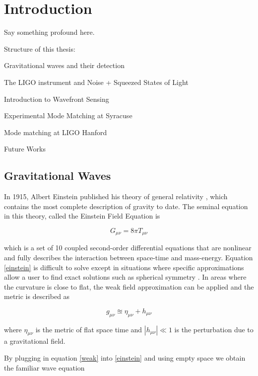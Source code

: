 \chapter{Introduction}\label{intro}

	Say something profound here.
	
	Structure of this thesis:
	
		Gravitational waves and their detection
	
		The LIGO instrument and Noise + Squeezed States of Light
	
		Introduction to Wavefront Sensing
	
		Experimental Mode Matching at Syracuse
	
		Mode matching at LIGO Hanford
	
		Future Works

	\section{Gravitational Waves}\label{gravitational waves}
	In 1915, Albert Einstein published his theory of general relativity \cite{einstein}, which contains the most complete description of gravity to date. The seminal equation in this theory, called the Einstein Field Equation is
	
	\begin{equation} \label{einstein}
	G_{\mu \nu} = 8 \pi T_{\mu \nu}
	\end{equation}
	
	which is a set of 10 coupled second-order differential equations that are nonlinear and fully describes the interaction between space-time and mass-energy. Equation \ref{einstein} is difficult to solve except in situations where specific approximations allow a user to find exact solutions such as spherical symmetry \cite{carroll_2003} \cite{schutz_2009}. In areas where the curvature is close to flat,  the weak field approximation can be applied and the metric is described as	
	
	\begin{equation} \label{weak}
	g_{\mu \nu}  \approxeq \eta_{\mu \nu} + h_{\mu \nu}
	\end{equation}
	
	where $\eta_{\mu \nu}$ is the metric of flat space time and $|h_{\mu \nu}| \ll 1$ is the perturbation due to a gravitational field.
	
	By plugging in equation \ref{weak} into \ref{einstein} and using empty space we obtain the familiar wave equation
	
